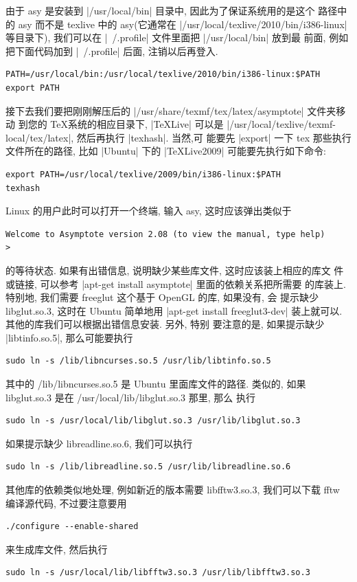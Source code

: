 \documentclass[nofonts,CJKnormalspaces]{ctexbook}
\begin{document}
由于 asy 是安装到 |/usr/local/bin| 目录中, 因此为了保证系统用的是这个
路径中的 asy 而不是 texlive 中的 asy(它通常在
|/usr/local/texlive/2010/bin/i386-linux|
等目录下), 我们可以在 |~/.profile| 文件里面把 |/usr/local/bin| 放到最
前面, 例如把下面代码加到 |~/.profile| 后面, 注销以后再登入.
\begin{verbatim}
PATH=/usr/local/bin:/usr/local/texlive/2010/bin/i386-linux:$PATH
export PATH
\end{verbatim}

接下去我们要把刚刚解压后的 |/usr/share/texmf/tex/latex/asymptote| 文件夹移动
到您的 \TeX 系统的相应目录下, |TeXLive| 可以是
|/usr/local/texlive/texmf-local/tex/latex|, 然后再执行 |texhash|. 当然,可
能要先 |export| 一下 tex 那些执行文件所在的路径, 比如 |Ubuntu| 下的
|TeXLive2009| 可能要先执行如下命令:
\begin{verbatim}
export PATH=/usr/local/texlive/2009/bin/i386-linux:$PATH
texhash
\end{verbatim}
Linux 的用户此时可以打开一个终端, 输入 asy, 这时应该弹出类似于
\begin{verbatim}
Welcome to Asymptote version 2.08 (to view the manual, type help)
>
\end{verbatim}
的等待状态. 如果有出错信息, 说明缺少某些库文件, 这时应该装上相应的库文
件或链接, 可以参考 |apt-get install asymptote| 里面的依赖关系把所需要
的库装上. 特别地, 我们需要 freeglut 这个基于 OpenGL 的库, 如果没有, 会
提示缺少 libglut.so.3, 这时在 Ubuntu 简单地用
|apt-get install freeglut3-dev|
装上就可以. 其他的库我们可以根据出错信息安装. 另外, 特别
要注意的是, 如果提示缺少 |libtinfo.so.5|, 那么可能要执行
\begin{verbatim}
sudo ln -s /lib/libncurses.so.5 /usr/lib/libtinfo.so.5
\end{verbatim}
其中的 /lib/libncurses.so.5 是 Ubuntu 里面库文件的路径.
类似的, 如果 libglut.so.3 是在 /usr/local/lib/libglut.so.3 那里, 那么
执行
\begin{verbatim}
sudo ln -s /usr/local/lib/libglut.so.3 /usr/lib/libglut.so.3
\end{verbatim}
如果提示缺少 libreadline.so.6, 我们可以执行
\begin{verbatim}
sudo ln -s /lib/libreadline.so.5 /usr/lib/libreadline.so.6
\end{verbatim}
其他库的依赖类似地处理, 例如新近的版本需要 libfftw3.so.3, 我们可以下载
fftw 编译源代码, 不过要注意要用
\begin{verbatim}
./configure --enable-shared
\end{verbatim}
来生成库文件, 然后执行
\begin{verbatim}
sudo ln -s /usr/local/lib/libfftw3.so.3 /usr/lib/libfftw3.so.3
\end{verbatim}
\end{document}
